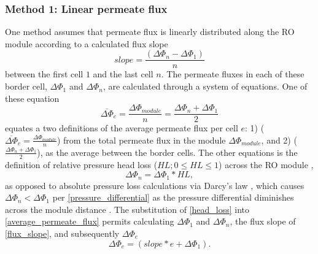 \subsubsection{Method 1: Linear permeate flux}
One method assumes that permeate flux is linearly distributed along the RO module according to a calculated flux slope
\begin{equation} \label{flux_slope}
    slope = \frac{(\Delta \Phi_{n}-\Delta \Phi_{1})}{n}
\end{equation}
between the first cell $1$ and the last cell $n$. The permeate fluxes in each of these border cell, $\Delta \Phi_{1}$ and $\Delta \Phi_{n}$, are calculated through a system of equations. One of these equation 
\begin{equation} \label{average_permeate_flux}
     \overbar{\Delta \Phi}_{e} = \frac{\Delta \Phi_{module}}{n} = \frac{\Delta \Phi_{n} + \Delta \Phi_{1}}{2}
\end{equation}
equates a two definitions of the average permeate flux per cell $e$: 1) ($\overbar{\Delta \Phi}_{e} = \frac{\Delta \Phi_{module}}{n}$) from the total permeate flux in the module $\Delta \Phi_{module}$, and 2) ($\frac{\Delta \Phi_{n} + \Delta \Phi_{1}}{2}$), as the average between the border cells. The other equations is the definition of relative pressure head loss \cite{Srivathsan2014ReverseUnsteadiness,Gu2020ModelingNetworks} ($HL ; 0\le HL\le 1$) across the RO module \cite{Fraidenraich2009ReverseExperiment},
\begin{equation} \label{head_loss}
     \Delta \Phi_{n}= \Delta \Phi_{1}*HL,
\end{equation}
as opposed to absolute pressure loss calculations via Darcy's law \cite{Strubbe2018CalibrationFull-Scale}, which causes $\Delta \Phi_{n}<\Delta \Phi_{1}$ per \cref{pressure_differential} as the pressure differential diminishes across the module distance \cite{Li2016Three-dimensionalChannel}. The substitution of \cref{head_loss} into \cref{average_permeate_flux} permits calculating $\Delta \Phi_{1}$ and  $\Delta \Phi_{n}$, the flux slope of \cref{flux_slope}, and subsequently $\Delta \Phi_{e}$
\begin{equation} \label{intermediary_permeate_flux}
    \Delta \Phi_{e} = (slope*e+\Delta \Phi_{1}).
\end{equation}

